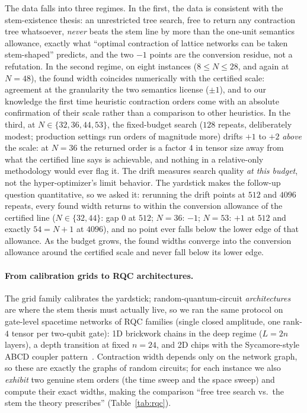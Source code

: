 \documentclass[sigplan,10pt,screen,review,anonymous]{acmart}
\begin{document}
The data falls into three regimes. In the first, the data is consistent with the
stem-existence thesis: an unrestricted tree search, free to return any contraction
tree whatsoever, \emph{never} beats the stem line by more than the one-unit semantics
allowance, exactly what ``optimal contraction of lattice networks can be taken
stem-shaped'' predicts, and the two $-1$ points are the conversion residue, not a
refutation. In the second regime, on eight instances ($8 \le N \le 28$, and again at
$N = 48$), the found width coincides numerically with the certified
scale: agreement at the granularity the two semantics license ($\pm 1$), and to our
knowledge the first time heuristic contraction orders come with an absolute confirmation
of their scale rather than a comparison to other heuristics.
In the third, at $N \in \{32, 36, 44, 53\}$, the fixed-budget search ($128$ repeats,
deliberately modest; production settings run orders of magnitude more) drifts $+1$ to $+2$
\emph{above} the scale: at $N=36$ the returned order is a factor $4$ in tensor size
away from what the certified line says is achievable, and nothing in a relative-only
methodology would ever flag it. The drift measures search quality \emph{at this budget},
not the hyper-optimizer's limit behavior. The yardstick makes the follow-up
question quantitative, so we asked it: rerunning the drift points at $512$ and $4096$
repeats, every found width returns to within the conversion allowance of the certified
line ($N \in \{32, 44\}$: gap $0$ at $512$; $N=36$: $-1$; $N=53$: $+1$ at $512$ and
exactly $54 = N+1$ at $4096$), and no point ever falls below the lower edge of that
allowance. As the budget grows, the found widths converge into the conversion allowance
around the certified scale and never fall below its lower edge.

\paragraph{From calibration grids to RQC architectures.}
The grid family calibrates the yardstick; random-quantum-circuit \emph{architectures} are
where the stem thesis must actually live, so we ran the same protocol on gate-level
spacetime networks of RQC families (single closed amplitude, one rank-$4$ tensor per
two-qubit gate): 1D brickwork chains in the deep regime ($L = 2n$ layers), a depth
transition at fixed $n=24$, and 2D chips with the Sycamore-style ABCD coupler
pattern~\cite{arute2019quantum}. Contraction width depends only on the network graph, so
these are exactly the graphs of random circuits; for each instance we also \emph{exhibit}
two genuine stem orders (the time sweep and the space sweep) and compute their exact
widths, making the comparison ``free tree search vs.\ the stem the theory prescribes''
(Table~\ref{tab:rqc}).
\end{document}
